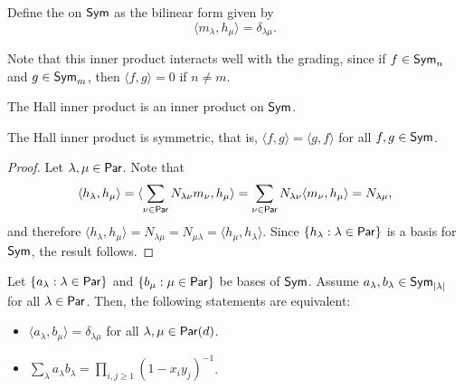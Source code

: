 \begin{definition}
	Define the  on \(\operatorname{\mathsf{Sym}}\) as the bilinear form given by
	\begin{equation}
		\langle m_\lambda, h_\mu \rangle = \delta_{\lambda\mu}.
	\end{equation}
\end{definition}

Note that this inner product interacts well with the grading,
since if \(f \in \operatorname{\mathsf{Sym}}_n\) and \(g \in \operatorname{\mathsf{Sym}}_m\),
then \(\langle f, g \rangle = 0\) if \(n \neq m\).

\begin{proposition} \label{prop:hall-inner-product-is-inner-product}
	The Hall inner product is an inner product on \(\operatorname{\mathsf{Sym}}\).
\end{proposition}

\begin{lemma} \label{prop:hall-is-symmetric}
	The Hall inner product is symmetric,
	that is,
	\(\langle f, g \rangle = \langle g, f \rangle\)
	for all \(f, g \in \operatorname{\mathsf{Sym}}\).
\end{lemma}

\begin{proof}
	Let \(\lambda, \mu \in \operatorname{\mathsf{Par}}\).
	Note that
	\begin{equation}
		\langle h_\lambda, h_\mu \rangle
		= \langle \sum_{\nu \in \operatorname{\mathsf{Par}}} N_{\lambda\nu} m_\nu, h_\mu \rangle
		= \sum_{\nu \in \operatorname{\mathsf{Par}}} N_{\lambda\nu} \langle m_\nu, h_\mu \rangle
		= N_{\lambda\mu},
	\end{equation}
	and therefore \(\langle h_\lambda, h_\mu \rangle = N_{\lambda\mu} = N_{\mu\lambda} = \langle h_\mu, h_\lambda \rangle\).
	Since \(\{h_\lambda : \lambda \in \operatorname{\mathsf{Par}}\}\) is a basis for \(\operatorname{\mathsf{Sym}}\), the result follows.
\end{proof}

\begin{lemma} \label{prop:othogonal-bases-characterization}
	Let \(\{a_\lambda : \lambda \in \operatorname{\mathsf{Par}}\}\) and \(\{b_\mu : \mu \in \operatorname{\mathsf{Par}}\}\) be bases of \(\operatorname{\mathsf{Sym}}\).
	Assume \(a_\lambda, b_\lambda \in \operatorname{\mathsf{Sym}}_{|\lambda|}\) for all \(\lambda \in \operatorname{\mathsf{Par}}\).
	Then, the following statements are equivalent:
	\begin{itemize}
		\item \(\langle a_\lambda, b_\mu \rangle = \delta_{\lambda\mu}\) for all \(\lambda, \mu \in \operatorname{\mathsf{Par}}(d)\).
		\item \(\sum_{\lambda} a_\lambda b_\lambda = \prod_{i,j \geq 1} (1 - x_iy_j)^{-1}\).
	\end{itemize}
\end{lemma}

